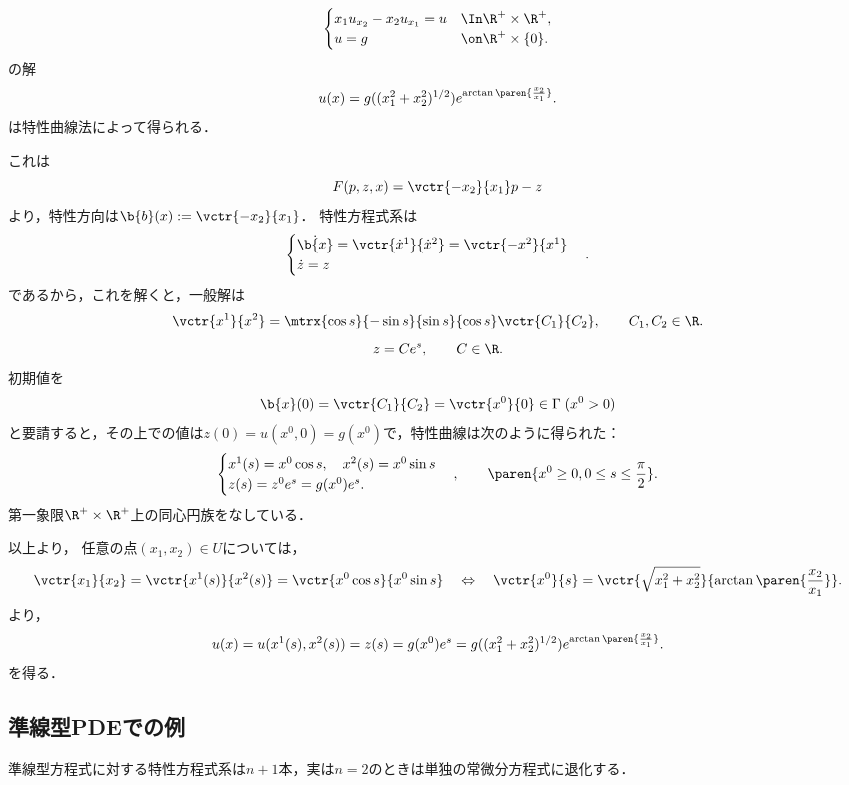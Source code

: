 \documentclass[uplatex,dvipdfmx]{jsreport}
\begin{document}
\begin{example}[特性方程式が解ける変数係数線型PDEの例]
    \[\begin{cases}
        x_1u_{x_2}-x_2u_{x_1}=u&\In \R^+\times\R^+,\\
        u=g&\on\R^+\times\{0\}.
    \end{cases}\]
    の解
    \[u(x)=g((x_1^2+x_2^2)^{1/2})e^{\arctan\paren{\frac{x_2}{x_1}}}.\]
    は特性曲線法によって得られる．
\end{example}
\begin{Proof}
    これは
    \[F(p,z,x)=\vctr{-x_2}{x_1}p-z\]
    より，特性方向は$\b{b}(x):=\vctr{-x_2}{x_1}$．
    特性方程式系は
    \[\begin{cases}
        \dot{\b{x}}=\vctr{\dot{x}^1}{\dot{x}^2}=\vctr{-x^2}{x^1}\\
        \dot{z}=z
    \end{cases}.\]
    であるから，これを解くと，一般解は
    \[\vctr{x^1}{x^2}=\mtrx{\cos s}{-\sin s}{\sin s}{\cos s}\vctr{C_1}{C_2},\qquad C_1,C_2\in\R.\]
    \[z=Ce^s,\qquad C\in\R.\]
    初期値を
    \[\b{x}(0)=\vctr{C_1}{C_2}=\vctr{x^0}{0}\in\Gamma\;(x^0>0)\]
    と要請すると，その上での値は$z(0)=u(x^0,0)=g(x^0)$で，特性曲線は次のように得られた：
    \[\begin{cases}
        x^1(s)=x^0\cos s,\quad x^2(s)=x^0\sin s\\
        z(s)=z^0e^s=g(x^0)e^s.
    \end{cases},\qquad\paren{x^0\ge0,0\le s\le\frac{\pi}{2}}.\]
    第一象限$\R^+\times\R^+$上の同心円族をなしている．

    以上より，
    任意の点$(x_1,x_2)\in U$については，
    \[\vctr{x_1}{x_2}=\vctr{x^1(s)}{x^2(s)}=\vctr{x^0\cos s}{x^0\sin s}\quad\Leftrightarrow\quad\vctr{x^0}{s}=\vctr{\sqrt{x_1^2+x_2^2}}{\arctan\paren{\frac{x_2}{x_1}}}.\]
    より，
    \[u(x)=u(x^1(s),x^2(s))=z(s)=g(x^0)e^s=g((x_1^2+x_2^2)^{1/2})e^{\arctan\paren{\frac{x_2}{x_1}}}.\]
    を得る．
\end{Proof}

\subsection{準線型PDEでの例}

\begin{tcolorbox}[colframe=ForestGreen, colback=ForestGreen!10!white,breakable,colbacktitle=ForestGreen!40!white,coltitle=black,fonttitle=\bfseries\sffamily,
title=]
    準線型方程式に対する特性方程式系は$n+1$本，実は$n=2$のときは単独の常微分方程式に退化する．
\end{tcolorbox}
\end{document}
